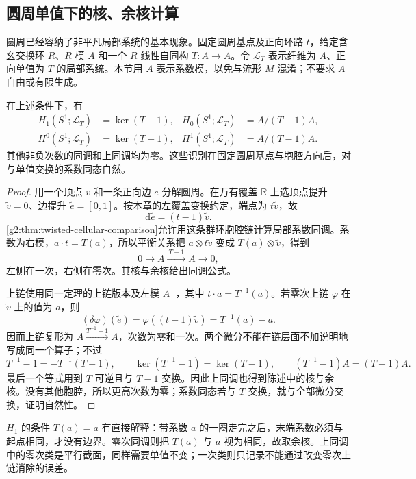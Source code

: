 \subsection{圆周单值下的核、余核计算}
\label{g2:subsec:0503:02}
圆周已经容纳了非平凡局部系统的基本现象。固定圆周基点及正向环路 \(t\)，给定含幺交换环 \(R\)、\(R\) 模 \(A\) 和一个 \(R\) 线性自同构 \(T:A\to A\)。令 \(\mathcal L_T\) 表示纤维为 \(A\)、正向单值为 \(T\) 的局部系统。本节用 \(A\) 表示系数模，以免与流形 \(M\) 混淆；不要求 \(A\) 自由或有限生成。

\begin{proposition}\label{g2:prop:circle-local-coefficients}
	在上述条件下，有
	\begin{align*}
		H_1(S^1;\mathcal L_T)&=\ker(T-1),& H_0(S^1;\mathcal L_T)&=A/(T-1)A,\\
		H^0(S^1;\mathcal L_T)&=\ker(T-1),& H^1(S^1;\mathcal L_T)&=A/(T-1)A.
	\end{align*}
	其他非负次数的同调和上同调均为零。这些识别在固定圆周基点与胞腔方向后，对与单值交换的系数同态自然。
\end{proposition}
\begin{proof}
	用一个顶点 \(v\) 和一条正向边 \(e\) 分解圆周。在万有覆盖 \(\mathbb R\) 上选顶点提升 \(\widetilde v=0\)、边提升 \(\widetilde e=[0,1]\)。按本章的左覆盖变换约定，端点为 \(t\widetilde v\)，故
	\[
		\mathrm d\widetilde e=(t-1)\widetilde v.
	\]
	\cref{g2:thm:twisted-cellular-comparison}允许用这条群环胞腔链计算局部系数同调。系数为右模，\(a\cdot t=T(a)\)，所以平衡关系把 \(a\otimes t\widetilde v\) 变成 \(T(a)\otimes\widetilde v\)，得到
	\begin{equation}\label{g2:eq:circle-twisted-chain}
		0\longrightarrow A\xrightarrow{\ T-1\ }A\longrightarrow0,
	\end{equation}
	左侧在一次，右侧在零次。其核与余核给出同调公式。

	上链使用同一定理的上链版本及左模 \(A^{-}\)，其中 \(t\cdot a=T^{-1}(a)\)。若零次上链 \(\varphi\) 在 \(\widetilde v\) 上的值为 \(a\)，则
	\[
		(\delta\varphi)(\widetilde e)=\varphi((t-1)\widetilde v)=T^{-1}(a)-a.
	\]
	因而上链复形为 \(A\xrightarrow{T^{-1}-1}A\)，次数为零和一次。两个微分不能在链层面不加说明地写成同一个算子；不过
	\[
		T^{-1}-1=-T^{-1}(T-1),\qquad
		\ker(T^{-1}-1)=\ker(T-1),\qquad
		(T^{-1}-1)A=(T-1)A.
	\]
	最后一个等式用到 \(T\) 可逆且与 \(T-1\) 交换。因此上同调也得到陈述中的核与余核。没有其他胞腔，所以更高次数为零；系数同态若与 \(T\) 交换，就与全部微分交换，证明自然性。
\end{proof}

\(H_1\) 的条件 \(T(a)=a\) 有直接解释：带系数 \(a\) 的一圈走完之后，末端系数必须与起点相同，才没有边界。零次同调则把 \(T(a)\) 与 \(a\) 视为相同，故取余核。上同调中的零次类是平行截面，同样需要单值不变；一次类则只记录不能通过改变零次上链消除的误差。

